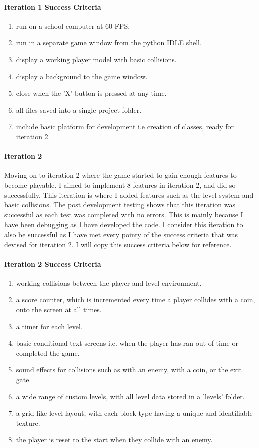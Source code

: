 \documentclass[12pt]{report}
\begin{document}
\paragraph{Iteration 1 Success Criteria}
\begin{enumerate}
    \item run on a school computer at 60 FPS.
    \item run in a separate game window from the python IDLE shell.
    \item display a working player model with basic collisions.
    \item display a background to the game window.
    \item close when the 'X' button is pressed at any time.
    \item all files saved into a single project folder.
    \item include basic platform for development i.e creation of classes, ready for iteration 2.
\end{enumerate}

\paragraph{Iteration 2}
Moving on to iteration 2 where the game started to gain enough features to become playable. I aimed to implement 8 features in iteration 2, and did so successfully. This iteration is where I added features such as the level system and basic collisions. The post development testing shows that this iteration was successful as each test was completed with no errors. This is mainly because I have been debugging as I have developed the code. I consider this iteration to also be successful as I have met every pointy of the success criteria that was devised for iteration 2. I will copy this success criteria below for reference.


\paragraph{Iteration 2 Success Criteria}
\begin{enumerate}
    \item working collisions between the player and level environment.
    \item a score counter, which is incremented every time a player collides with a coin, onto the screen at all times.
    \item a timer for each level.
    \item basic conditional text screens i.e. when the player has ran out of time or completed the game.
    \item sound effects for collisions such as with an enemy, with a coin, or the exit gate.
    \item a wide range of custom levels, with all level data stored in a 'levels' folder.
    \item a grid-like level layout, with each block-type having a unique and identifiable texture.
    \item the player is reset to the start when they collide with an enemy.
\end{enumerate}
\end{document}
